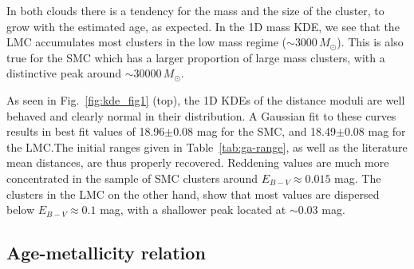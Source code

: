 \documentclass{aa}
\begin{document}
In both clouds there is a tendency for the mass and the size of the cluster, to
grow with the estimated age, as expected. In the 1D mass KDE, we see that the
LMC accumulates most clusters in the low mass regime (${\sim}3000\,M_{\odot}$).
This is also true for the SMC which has a larger proportion of large mass
clusters, with a distinctive peak around ${\sim}30000\,M_{\odot}$.


As seen in Fig.~\ref{fig:kde_fig1} (top), the 1D KDEs of the distance
moduli are well behaved and clearly normal in their distribution.
A Gaussian fit to these curves results in best fit values of 18.96$\pm$0.08 mag
for the SMC, and 18.49$\pm$0.08 mag for the LMC.\@ The initial ranges given in
Table~\ref{tab:ga-range}, as well as the literature mean distances, are thus
properly recovered.
%
Reddening values are much more concentrated in the sample of SMC clusters
around $E_{B-V}{\approx}0.015$ mag. The clusters in the LMC on the other hand,
show that most values are dispersed below $E_{B-V}{\approx}0.1$ mag, with a
shallower peak located at ${\sim}0.03$ mag.








\subsection{Age-metallicity relation}
\label{ssec:amr}
\end{document}
